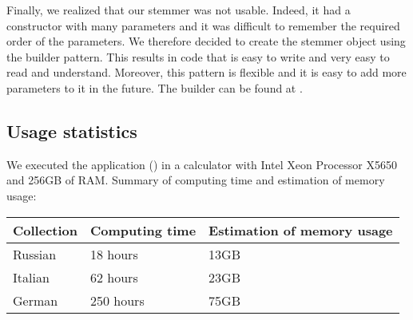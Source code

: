             Finally, we realized that our stemmer was not usable. Indeed, it had a constructor with many parameters and it was difficult to remember the required order of the parameters. We therefore decided to create the stemmer object using the builder pattern. This results in code that is easy to write and very easy to read and understand. Moreover, this pattern is flexible and it is easy to add more parameters to it in the future. The builder can be found at .


    \subsection{Usage statistics}
        We executed the application () in a calculator with Intel\textsuperscript{\textregistered} Xeon\textsuperscript{\textregistered} Processor X5650 and 256GB of RAM. Summary of computing time and estimation of memory usage:
        \begin{center}
			\begin{tabular}[H]{| p{} | p{} | p{} |}
                \hline
                Collection  & Computing time    & Estimation of memory usage \\ \hline\hline
				Russian     & 18 hours          & 13GB                       \\ \hline
                Italian     & 62 hours          & 23GB                       \\ \hline
                German      & 250 hours         & 75GB                       \\ \hline %
			\end{tabular}
        \end{center}